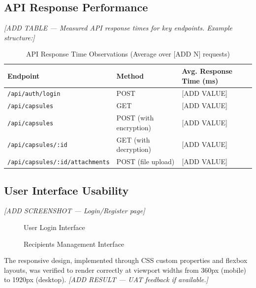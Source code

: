 \documentclass[12pt, a4paper]{article}
\begin{document}
\subsection{API Response Performance}

\textit{[ADD TABLE — Measured API response times for key endpoints. Example structure:]}

\begin{table}[H]
  \centering
  \caption{API Response Time Observations (Average over [ADD N] requests)}
  \label{tab:api_perf}
  \begin{tabular}{|l|l|l|}
  \hline
  \textbf{Endpoint} & \textbf{Method} & \textbf{Avg. Response Time (ms)} \\
  \hline
  \texttt{/api/auth/login} & POST & [ADD VALUE] \\
  \hline
  \texttt{/api/capsules} & GET & [ADD VALUE] \\
  \hline
  \texttt{/api/capsules} & POST (with encryption) & [ADD VALUE] \\
  \hline
  \texttt{/api/capsules/:id} & GET (with decryption) & [ADD VALUE] \\
  \hline
  \texttt{/api/capsules/:id/attachments} & POST (file upload) & [ADD VALUE] \\
  \hline
  \end{tabular}
\end{table}

\subsection{User Interface Usability}

\textit{[ADD SCREENSHOT — Login/Register page]}

\begin{figure}[H]
  \centering
  \caption{User Login Interface}
  \label{fig:login}
\end{figure}

\begin{figure}[H]
  \centering
  \caption{Recipients Management Interface}
  \label{fig:recipients}
\end{figure}

The responsive design, implemented through CSS custom properties and flexbox layouts, was verified to render correctly at viewport widths from 360px (mobile) to 1920px (desktop). \textit{[ADD RESULT — UAT feedback if available.]}
\end{document}
